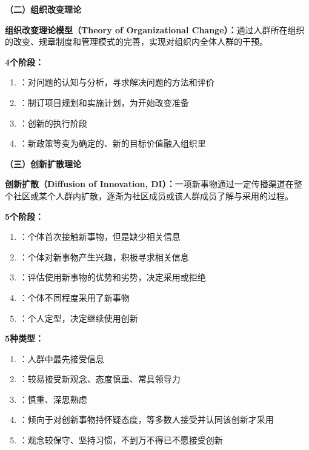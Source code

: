 \begin{defbox}
\textbf{（二）组织改变理论}

\textbf{组织改变理论模型（Theory of Organizational Change）：}通过人群所在组织的改变、规章制度和管理模式的完善，实现对组织内全体人群的干预。

\textbf{4个阶段：}
\begin{enumerate}[leftmargin=*]
    \item {}：对问题的认知与分析，寻求解决问题的方法和评价
    \item {}：制订项目规划和实施计划，为开始改变准备
    \item {}：创新的执行阶段
    \item {}：新政策等变为确定的、新的目标价值融入组织里
\end{enumerate}
\end{defbox}

\begin{defbox}
\textbf{（三）创新扩散理论}

\textbf{创新扩散（Diffusion of Innovation, DI）：}一项新事物通过一定传播渠道在整个社区或某个人群内扩散，逐渐为社区成员或该人群成员了解与采用的过程。

\textbf{5个阶段：}
\begin{enumerate}[leftmargin=*]
    \item {}：个体首次接触新事物，但是缺少相关信息
    \item {}：个体对新事物产生兴趣，积极寻求相关信息
    \item {}：评估使用新事物的优势和劣势，决定采用或拒绝
    \item {}：个体不同程度采用了新事物
    \item {}：个人定型，决定继续使用创新
\end{enumerate}

\textbf{5种类型：}
\begin{enumerate}[leftmargin=*]
    \item {}：人群中最先接受信息
    \item {}：较易接受新观念、态度慎重、常具领导力
    \item {}：慎重、深思熟虑
    \item {}：倾向于对创新事物持怀疑态度，等多数人接受并认同该创新才采用
    \item {}：观念较保守、坚持习惯，不到万不得已不愿接受创新
\end{enumerate}
\end{defbox}

